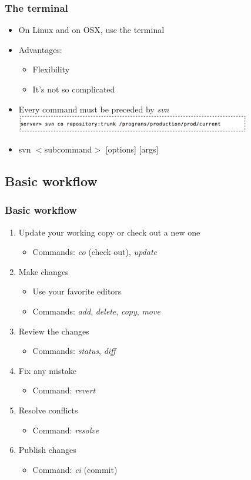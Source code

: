 \documentclass{beamer}
\begin{document}
\frame
{
  \frametitle{The terminal}
  
  \begin{itemize}
  \item<1-> On Linux and on OSX, use the terminal
  \item<2-> Advantages:
  	\begin{itemize}
	\item<1-> Flexibility
	\item<2-> It's not so complicated
	\end{itemize}
  \item<3-> Every command must be preceded by \textit{svn}
  \includegraphics[height=0.8cm]{svn_example.png}
  \item<4-> svn $<$subcommand$>$ [options] [args]
  \end{itemize}
	
}

\subsection{Basic workflow}

\frame
{
  \frametitle{Basic workflow}
  
  \begin{enumerate}
  \item<1-> Update your working copy or check out a new one
  	\begin{itemize}
  	\item<1-> Commands: \textit{co} (check out), \textit{update}
  	\end{itemize}
  \item<2-> Make changes
  	\begin{itemize}
	\item<2-> Use your favorite editors
	\item<2-> Commands: \textit{add}, \textit{delete}, \textit{copy}, \textit{move}
	\end{itemize}
  \item<3-> Review the changes
  	\begin{itemize}
	\item<3-> Commands: \textit{status}, \textit{diff}
	\end{itemize}
  \item<4-> Fix any mistake
  	\begin{itemize}
	\item<4-> Command: \textit{revert}
	\end{itemize}
  \item<5-> Resolve conflicts
  	\begin{itemize}
	\item<4-> Command: \textit{resolve}
	\end{itemize}
  \item<6-> Publish changes
  	\begin{itemize}
	\item<4-> Command: \textit{ci} (commit)
	\end{itemize}
  \end{enumerate}

}
\end{document}
